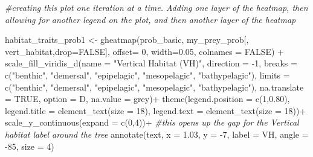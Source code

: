\documentclass[
]{article}
\newenvironment{Shaded}{\begin{snugshade}}{\end{snugshade}}
\newcommand{\AttributeTok}[1]{\textcolor[rgb]{0.77,0.63,0.00}{#1}}
\newcommand{\CommentTok}[1]{\textcolor[rgb]{0.56,0.35,0.01}{\textit{#1}}}
\newcommand{\ConstantTok}[1]{\textcolor[rgb]{0.00,0.00,0.00}{#1}}
\newcommand{\DecValTok}[1]{\textcolor[rgb]{0.00,0.00,0.81}{#1}}
\newcommand{\FloatTok}[1]{\textcolor[rgb]{0.00,0.00,0.81}{#1}}
\newcommand{\FunctionTok}[1]{\textcolor[rgb]{0.00,0.00,0.00}{#1}}
\newcommand{\NormalTok}[1]{#1}
\newcommand{\OtherTok}[1]{\textcolor[rgb]{0.56,0.35,0.01}{#1}}
\newcommand{\SpecialCharTok}[1]{\textcolor[rgb]{0.00,0.00,0.00}{#1}}
\newcommand{\StringTok}[1]{\textcolor[rgb]{0.31,0.60,0.02}{#1}}
\begin{document}
\begin{Shaded}
\begin{Highlighting}[]
\CommentTok{\#creating this plot one iteration at a time. Adding one layer of the heatmap, then allowing for another legend on the plot, and then another layer of the heatmap}

\NormalTok{habitat\_traits\_prob1 }\OtherTok{\textless{}{-}} \FunctionTok{gheatmap}\NormalTok{(prob\_basic, my\_prey\_prob[, }\StringTok{\textquotesingle{}vert\_habitat\textquotesingle{}}\NormalTok{,}\AttributeTok{drop=}\ConstantTok{FALSE}\NormalTok{], }
                                 \AttributeTok{offset=} \DecValTok{0}\NormalTok{, }\AttributeTok{width=}\FloatTok{0.05}\NormalTok{, }\AttributeTok{colnames =} \ConstantTok{FALSE}\NormalTok{) }\SpecialCharTok{+}
  \FunctionTok{scale\_fill\_viridis\_d}\NormalTok{(}\AttributeTok{name =} \StringTok{"Vertical Habitat (VH)"}\NormalTok{, }
                       \AttributeTok{direction =} \SpecialCharTok{{-}}\DecValTok{1}\NormalTok{, }
                       \AttributeTok{breaks =} \FunctionTok{c}\NormalTok{(}\StringTok{"benthic"}\NormalTok{, }\StringTok{"demersal"}\NormalTok{, }\StringTok{"epipelagic"}\NormalTok{, }\StringTok{"mesopelagic"}\NormalTok{, }\StringTok{"bathypelagic"}\NormalTok{),}
                       \AttributeTok{limits =} \FunctionTok{c}\NormalTok{(}\StringTok{"benthic"}\NormalTok{, }\StringTok{"demersal"}\NormalTok{, }\StringTok{"epipelagic"}\NormalTok{, }\StringTok{"mesopelagic"}\NormalTok{, }\StringTok{"bathypelagic"}\NormalTok{), }
                       \AttributeTok{na.translate =} \ConstantTok{TRUE}\NormalTok{, }
                       \AttributeTok{option =} \StringTok{\textquotesingle{}D\textquotesingle{}}\NormalTok{, }
                       \AttributeTok{na.value =} \StringTok{\textquotesingle{}grey\textquotesingle{}}\NormalTok{)}\SpecialCharTok{+}
  \FunctionTok{theme}\NormalTok{(}\AttributeTok{legend.position =} \FunctionTok{c}\NormalTok{(}\DecValTok{1}\NormalTok{,}\FloatTok{0.80}\NormalTok{),}
        \AttributeTok{legend.title =} \FunctionTok{element\_text}\NormalTok{(}\AttributeTok{size =} \DecValTok{18}\NormalTok{), }
        \AttributeTok{legend.text =} \FunctionTok{element\_text}\NormalTok{(}\AttributeTok{size =} \DecValTok{18}\NormalTok{))}\SpecialCharTok{+}
  \FunctionTok{scale\_y\_continuous}\NormalTok{(}\AttributeTok{expand =} \FunctionTok{c}\NormalTok{(}\DecValTok{0}\NormalTok{,}\DecValTok{4}\NormalTok{))}\SpecialCharTok{+} \CommentTok{\#this opens up the gap for the Vertical habitat label around the tree}
  \FunctionTok{annotate}\NormalTok{(}\StringTok{\textquotesingle{}text\textquotesingle{}}\NormalTok{, }\AttributeTok{x =} \FloatTok{1.03}\NormalTok{, }\AttributeTok{y =} \SpecialCharTok{{-}}\DecValTok{7}\NormalTok{, }\AttributeTok{label =} \StringTok{\textquotesingle{}VH\textquotesingle{}}\NormalTok{, }\AttributeTok{angle =} \SpecialCharTok{{-}}\DecValTok{85}\NormalTok{, }\AttributeTok{size =} \DecValTok{4}\NormalTok{)}


\end{Highlighting}
\end{Shaded}
\end{document}
